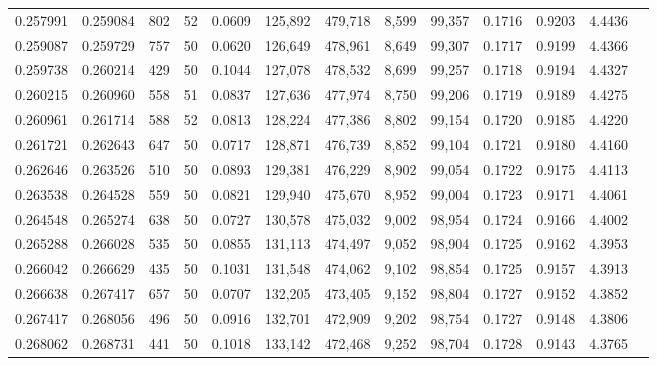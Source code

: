 \begin{tabular}{rrrrrrrrrrrrr}
0.257991 & 0.259084 &   802 &  52 &                                     0.0609 & 125,892 & 479,718 &   8,599 &  99,357 & 0.1716 & 0.9203 & 4.4436 \\
0.259087 & 0.259729 &   757 &  50 &                                     0.0620 & 126,649 & 478,961 &   8,649 &  99,307 & 0.1717 & 0.9199 & 4.4366 \\
0.259738 & 0.260214 &   429 &  50 &                                     0.1044 & 127,078 & 478,532 &   8,699 &  99,257 & 0.1718 & 0.9194 & 4.4327 \\
0.260215 & 0.260960 &   558 &  51 &                                     0.0837 & 127,636 & 477,974 &   8,750 &  99,206 & 0.1719 & 0.9189 & 4.4275 \\
0.260961 & 0.261714 &   588 &  52 &                                     0.0813 & 128,224 & 477,386 &   8,802 &  99,154 & 0.1720 & 0.9185 & 4.4220 \\
0.261721 & 0.262643 &   647 &  50 &                                     0.0717 & 128,871 & 476,739 &   8,852 &  99,104 & 0.1721 & 0.9180 & 4.4160 \\
0.262646 & 0.263526 &   510 &  50 &                                     0.0893 & 129,381 & 476,229 &   8,902 &  99,054 & 0.1722 & 0.9175 & 4.4113 \\
0.263538 & 0.264528 &   559 &  50 &                                     0.0821 & 129,940 & 475,670 &   8,952 &  99,004 & 0.1723 & 0.9171 & 4.4061 \\
0.264548 & 0.265274 &   638 &  50 &                                     0.0727 & 130,578 & 475,032 &   9,002 &  98,954 & 0.1724 & 0.9166 & 4.4002 \\
0.265288 & 0.266028 &   535 &  50 &                                     0.0855 & 131,113 & 474,497 &   9,052 &  98,904 & 0.1725 & 0.9162 & 4.3953 \\
0.266042 & 0.266629 &   435 &  50 &                                     0.1031 & 131,548 & 474,062 &   9,102 &  98,854 & 0.1725 & 0.9157 & 4.3913 \\
0.266638 & 0.267417 &   657 &  50 &                                     0.0707 & 132,205 & 473,405 &   9,152 &  98,804 & 0.1727 & 0.9152 & 4.3852 \\
0.267417 & 0.268056 &   496 &  50 &                                     0.0916 & 132,701 & 472,909 &   9,202 &  98,754 & 0.1727 & 0.9148 & 4.3806 \\
0.268062 & 0.268731 &   441 &  50 &                                     0.1018 & 133,142 & 472,468 &   9,252 &  98,704 & 0.1728 & 0.9143 & 4.3765 \\

\end{tabular}
